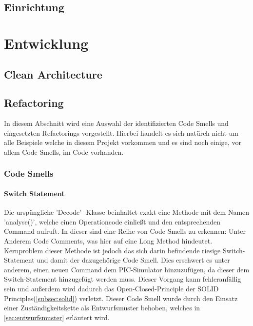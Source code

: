 \documentclass[12pt,a4paper,titlepage,ngerman,pdftex]{report}
\begin{document}
    \section{Einrichtung}\label{sec:einrichtung}

    \chapter{Entwicklung}\label{ch:entwicklung}
    \section{Clean Architecture}\label{sec:cleanarchitecture}
 
    \section{Refactoring}\label{sec:refactoring}

    In diesem Abschnitt wird eine Auswahl der identifizierten Code Smells und eingesetzten Refactorings vorgestellt. Hierbei handelt es sich natürch nicht um alle Beispiele welche in diesem Projekt vorkommen und es sind noch einige, vor allem Code Smells, im Code vorhanden. 

    \subsection{Code Smells}

    \subsubsection{Switch Statement}

    Die urspüngliche 'Decode'- Klasse beinhaltet exakt eine Methode mit dem Namen 'analyse()', welche einen Operationcode einließt und den entsprechenden Command aufruft. In dieser sind eine Reihe von Code Smells zu erkennen: Unter Anderem Code Comments, was hier auf eine Long Method hindeutet.
    Kernproblem dieser Methode ist jedoch das sich darin befindende riesige Switch-Statement und damit der dazugehörige Code Smell. Dies erschwert es unter anderem, einen neuen Command dem PIC-Simulator hinzuzufügen,
    da dieser dem Switch-Statement hinzugefügt werden muss. Dieser Vorgang kann fehleranfällig sein und außerdem wird dadurch das Open-Closed-Principle der SOLID Principles(\autoref{subsec:solid}) verletzt. 
    Dieser Code Smell wurde durch den Einsatz einer Zuständigkeitskette als Entwurfsmuster behoben, welches in \autoref{sec:entwurfsmuster} erläutert wird.
\end{document}
